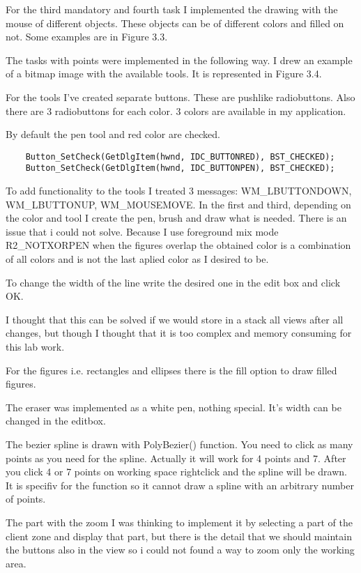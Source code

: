For the third mandatory and fourth task I implemented the drawing with the mouse of different objects. These objects can be of different colors and filled on not. Some examples are in Figure 3.3. 

The tasks with points were implemented in the following way. I drew an example of a bitmap image with the available tools. It is represented in Figure 3.4. 

For the tools I've created separate buttons. These are pushlike radiobuttons. Also there are 3 radiobuttons for each color. 3 colors are available in my application. 

By default the pen tool and red color are checked. 

\begin{lstlisting}
	Button_SetCheck(GetDlgItem(hwnd, IDC_BUTTONRED), BST_CHECKED);
	Button_SetCheck(GetDlgItem(hwnd, IDC_BUTTONPEN), BST_CHECKED);
\end{lstlisting} 

To add functionality to the tools I treated 3 messages: WM\_LBUTTONDOWN, WM\_LBUTTONUP, WM\_MOUSEMOVE. In the first and third, depending on the color and tool I create the pen, brush and draw what is needed. There is an issue that i could not solve. Because I use foreground mix mode R2\_NOTXORPEN when the figures overlap the obtained color is a combination of all colors and is not the last aplied color as I desired to be.

To change the width of the line write the desired one in the edit box and click OK.

I thought that this can be solved if we would store in a stack all views after all changes, but though I thought that it is too complex and memory consuming for this lab work.

For the figures i.e. rectangles and ellipses there is the fill option to draw filled figures. 

The eraser was implemented as a white pen, nothing special. It's width can be changed in the editbox.

The bezier spline is drawn with PolyBezier() function. You need to click as many points as you need for the spline. Actually it will work for 4 points and 7. After you click 4 or 7 points on working space rightclick and the spline will be drawn. It is specifiv for the function so it cannot draw a spline with an arbitrary number of points.

The part with the zoom I was thinking to implement it by selecting a part of the client zone and display that part, but there is the detail that we should maintain the buttons also in the view so i could not found a way to zoom only the working area.


